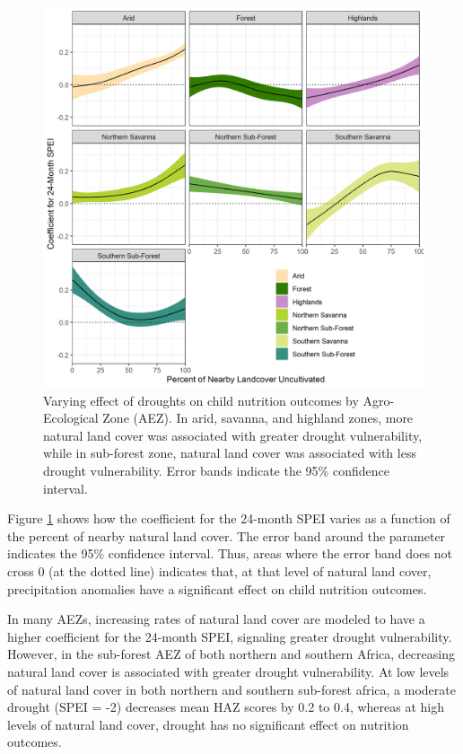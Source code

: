 \documentclass{article}
\begin{document}
\begin{figure}[h!]
	\begin{center}
	\includegraphics[width=0.8\linewidth]{AEZ_effects.png}
	\end{center}
	\caption{Varying effect of droughts on child nutrition outcomes by Agro-Ecological Zone (AEZ).  In arid, savanna, and highland zones, more natural land cover was associated with greater drought vulnerability, while in sub-forest zone, natural land cover was associated with less drought vulnerability.  Error bands indicate the 95\% confidence interval.}
	\label{fig:naturaleffect}
\end{figure}

Figure \ref{fig:naturaleffect} shows how the coefficient for the 24-month SPEI varies as a function of the percent of nearby natural land cover.  The error band around the parameter indicates the 95\% confidence interval.  Thus, areas where the error band does not cross 0 (at the dotted line) indicates that, at that level of natural land cover, precipitation anomalies have a significant effect on child nutrition outcomes.

In many AEZs, increasing rates of natural land cover are modeled to have a higher coefficient for the 24-month SPEI, signaling greater drought vulnerability.  However, in the sub-forest AEZ of both northern and southern Africa, decreasing natural land cover is associated with greater drought vulnerability.  At low levels of natural land cover in both northern and southern sub-forest africa, a moderate drought (SPEI = -2) decreases mean HAZ scores by 0.2 to 0.4, whereas at high levels of natural land cover, drought has no significant effect on nutrition outcomes.
\end{document}
